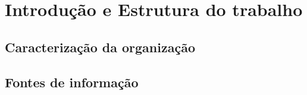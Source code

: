 \chapter{Introdução e Estrutura do trabalho}

\section{Caracterização da organização}

\section{Fontes de informação}